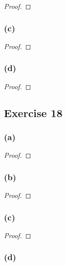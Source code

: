 \documentclass[14pt]{extarticle}
\begin{document}
\begin{proof}

\end{proof}

\subsubsection{(c)}

\begin{proof}

\end{proof}

\subsubsection{(d)}

\begin{proof}

\end{proof}

\subsection{Exercise 18}

\subsubsection{(a)}

\begin{proof}

\end{proof}

\subsubsection{(b)}

\begin{proof}

\end{proof}

\subsubsection{(c)}

\begin{proof}

\end{proof}

\subsubsection{(d)}
\end{document}
